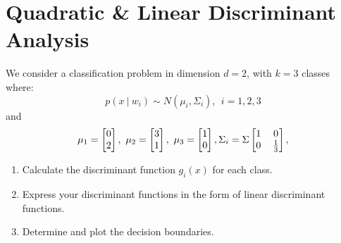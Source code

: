 \documentclass[12pt]{article}
\numberwithin{equation}{section}
\numberwithin{table}{section}
\numberwithin{figure}{section}
\begin{document}
\section{Quadratic \& Linear Discriminant Analysis}
We consider a classification problem in dimension $d=2$, with $k=3$ classes where:\\
$$
p(x\ |\ w_{i}) \sim N(\mu_{i}, \Sigma_{i}),\ \  i = 1, 2, 3
$$
and
$$
	\mu_1 = 	\renewcommand\arraystretch{1}
	\setlength\arraycolsep{6pt}
	\begin{bmatrix}
	0\\
	2\\
	\end{bmatrix},\ 
	\mu_2	 = 	\renewcommand\arraystretch{1}
	\setlength\arraycolsep{6pt}
	\begin{bmatrix}
	3\\
	1\\
	\end{bmatrix},\ 	
	\mu_3	 = 	\renewcommand\arraystretch{1}
	\setlength\arraycolsep{6pt}
	\begin{bmatrix}
	1\\
	0\\
	\end{bmatrix},
	\Sigma_{i}	 = \Sigma	\renewcommand\arraystretch{1}
	\setlength\arraycolsep{6pt}
	\begin{bmatrix}
	1 & 0\\
	0 & \frac{1}{3}\\
	\end{bmatrix},
$$
\begin{enumerate}[label=(\alph*)]
	\item Calculate the discriminant function $g_{i}(x)$ for each class.
	
	\item Express your discriminant functions in the form of linear discriminant functions.
	
	\item Determine and plot the decision boundaries.
\end{enumerate}
\end{document}
